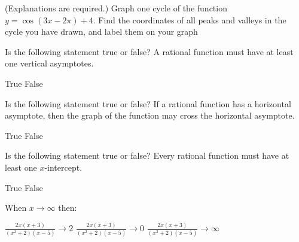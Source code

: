 \documentclass[11pt,answers]{exam}
\begin{document}
\begin{questions}

\question[4] (Explanations are required.) Graph one cycle of the function $\displaystyle y = \cos(3x - 2\pi) + 4$. Find the coordinates of all peaks and valleys  in the cycle you have drawn, and label them on your graph

\fillwithdottedlines{4cm}


\newpage
\question[1] Is the following statement true or false? A rational function must have at least one vertical asymptotes.
\begin{oneparchoices}
\choice True \choice False
\end{oneparchoices}
\question[1] Is the following statement true or false? If a rational function has a horizontal asymptote, then the graph of the function may cross the horizontal asymptote.
\begin{oneparchoices}
\choice True
\choice False
\end{oneparchoices}
\question[1] Is the following statement true or false? Every rational function must have at least one $x$-intercept.
\begin{oneparchoices}
\choice True
\choice False
\end{oneparchoices}
\question[1] When $x\to \infty$ then:

\begin{oneparchoices}
\choice  $\displaystyle \frac{2x(x+3)}{(x^2+2)(x-5)}\to 2$
\choice  $\displaystyle \frac{2x(x+3)}{(x^2+2)(x-5)}\to 0$
\choice  $\displaystyle \frac{2x(x+3)}{(x^2+2)(x-5)}\to \infty$
\end{oneparchoices}


\end{questions}
\end{document}
